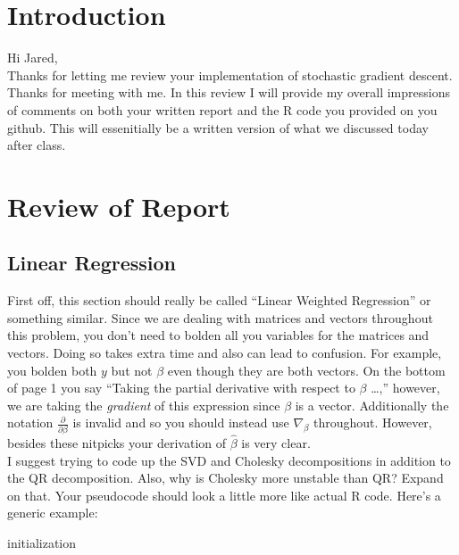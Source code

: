 \documentclass[11pt]{article}
\begin{document}
\maketitle

\setlength{\parindent}{0cm}

\section{Introduction}
Hi Jared, \\

Thanks for letting me review your implementation of stochastic gradient descent.
Thanks for meeting with me. In this review I will provide my overall impressions of comments on both your written report and the R code you provided on you github. This will essenitially be a written version of what we discussed today after class.

\section{Review of Report}

\subsection{Linear Regression}

First off, this section should really be called ``Linear Weighted Regression'' or something similar. Since we are dealing with matrices and vectors throughout this problem, you don't need to bolden all you variables for the matrices and vectors. Doing so takes extra time and also can lead to confusion. For example, you bolden both $y$ but not $\beta$ even though they are both vectors. On the bottom of page 1 you say ``Taking the partial derivative with respect to $\beta$ \ldots,'' however, we are taking the \emph{gradient} of this expression since $\beta$ is a vector. Additionally the notation $\frac{\partial}{\partial \beta}$ is invalid and so you should instead use $\nabla_\beta$ throughout. However, besides these nitpicks your derivation of $\hat{\beta}$ is very clear. \\

I suggest trying to code up the SVD and Cholesky decompositions in addition to the QR decomposition. Also, why is Cholesky more unstable than QR? Expand on that. Your pseudocode should look a little more like actual R code. Here's a generic example: \\

\begin{algorithm}[H]
 initialization\;
\end{algorithm}
\end{document}
